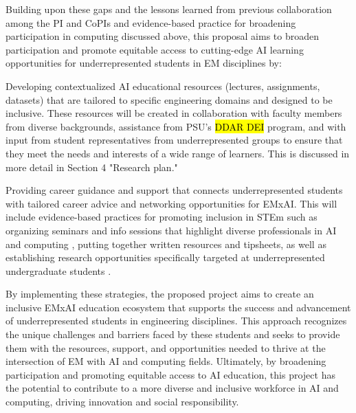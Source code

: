 \documentclass[11pt]{article}
\begin{document}
Building upon these gaps and the lessons learned from previous collaboration among the PI and CoPIs and evidence-based practice for broadening participation in computing discussed above\cite{walsh2022aspiring,stephenson2018retention, barker2017changing, cossa2021motivation, blaney2024sounds}, this proposal aims to broaden participation and promote equitable access to cutting-edge AI learning opportunities for underrepresented students in EM disciplines by:

\begin{gitemize3}
\item Developing contextualized AI educational resources (lectures, assignments, datasets) that are tailored to specific engineering domains and designed to be inclusive. These resources will be created in collaboration with faculty members from diverse backgrounds, assistance from PSU's \hl{DDAR DEI} program, and with input from student representatives from underrepresented groups to ensure that they meet the needs and interests of a wide range of learners. This is discussed in more detail in Section 4 "Research plan."
\end{gitemize3}


\begin{gitemize4}
\item Providing career guidance and support that connects underrepresented students with tailored career advice and networking opportunities for EMxAI. 
This will include evidence-based practices for promoting inclusion in STEm such as organizing seminars and info sessions that highlight diverse professionals in AI and computing \cite{sunasee2023incorporating}, putting together written resources and tipsheets, as well as establishing research opportunities specifically targeted at underrepresented undergraduate students \cite{sunasee2023incorporating}. 
\end{gitemize4}


By implementing these strategies, the proposed project aims to create an inclusive EMxAI education ecosystem that supports the success and advancement of underrepresented students in engineering disciplines. 
This approach recognizes the unique challenges and barriers faced by these students and seeks to provide them with the resources, support, and opportunities needed to thrive at the intersection of EM with AI and computing fields. Ultimately, by broadening participation and promoting equitable access to AI education, this project has the potential to contribute to a more diverse and inclusive workforce in AI and computing, driving innovation and social responsibility.
\end{document}

